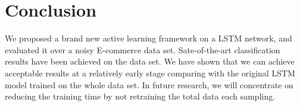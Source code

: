 \section{Conclusion}
\label{sec:conclude}
We proposed a brand new active learning framework on a LSTM network, and evaluated it over a noisy E-commerce data set. Sate-of-the-art classification results have been achieved on the data set. We have shown that we can achieve acceptable results at a relatively early stage comparing with the original LSTM model trained on the whole data set. In future research, we will concentrate on reducing the training time by not retraining the total data each sampling.

